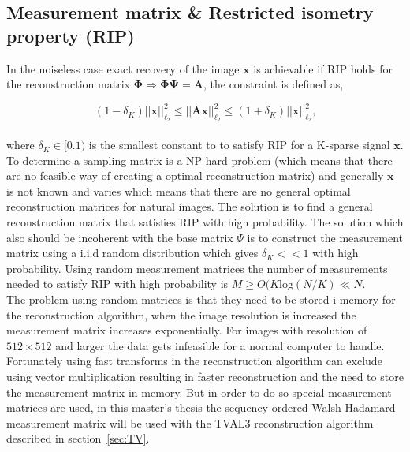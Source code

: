 \subsection{Measurement matrix \& Restricted isometry property (RIP)}

In the noiseless case exact recovery of the image $\mathbf{x}$ is achievable if RIP holds for the reconstruction matrix $\mathbf{\Phi} \Rightarrow \mathbf{\Phi\Psi = A}$, the constraint is defined as,

\begin{equation}
    (1-\delta_K)||\mathbf{x}||_{\ell_2}^2\leq||\mathbf{Ax}||_{\ell_2}^2\leq(1+\delta_K)||\mathbf{x}||_{\ell_2}^2 \text{,}
\end{equation}\\[0.1in]

where $\delta_K \in [0.1)$ is the smallest constant to to satisfy RIP for a K-sparse signal $\mathbf{x}$. To determine a sampling matrix is a NP-hard problem (which means that there are no feasible way of creating a optimal reconstruction matrix) and generally $\textbf{x}$ is not known and varies which means that there are no general optimal reconstruction matrices for natural images. The solution is to find a general reconstruction matrix that satisfies RIP with high probability. The solution which also should be incoherent with the base matrix $\Psi$ is to construct the measurement matrix using a i.i.d random distribution which gives $\delta_K << 1$ with high probability. Using random measurement matrices the number of measurements needed to satisfy RIP with high probability is $M \geq O(K\text{log}(N/K) \ll N$. \cite{book:srr,article:CS_donoho1}\\[0.1in]

The problem using random matrices is that they need to be stored i memory for the reconstruction algorithm, when the image resolution is increased the measurement matrix increases exponentially. For images with resolution of $512\times 512$ and larger the data gets infeasible for a normal computer to handle.  Fortunately using fast transforms in the reconstruction algorithm can exclude using vector multiplication resulting in faster reconstruction and the need to store the measurement matrix in memory. But in order to do so special measurement matrices are used, in this master's thesis the sequency ordered Walsh Hadamard measurement matrix will be used with the TVAL3 reconstruction algorithm described in section~\ref{sec:TV}.   


